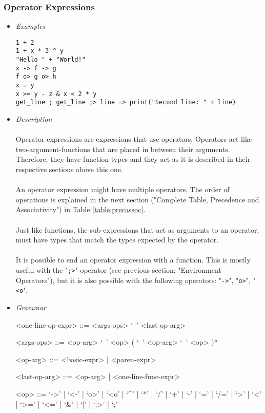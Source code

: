 \documentclass{article}
\begin{document}
\subsubsection{Operator Expressions}

\begin{itemize}
\item \textit{Examples}
\begin{verbatim}
1 + 2
1 + x * 3 ^ y
"Hello " + "World!"
x -> f -> g
f o> g o> h
x = y
x >= y - z & x < 2 * y
get_line ; get_line ;> line => print("Second line: " + line)
\end{verbatim}

\item \textit{Description}\\\\
Operator expressions are expressions that use operators. Operators act like
two-argument-functions that are placed in between their arguments. Therefore,
they have function types and they act as it is described in their respective
sections above this one.
\\\\
An operator expression might have multiple operators. The order of operations
is explained in the next section ("Complete Table, Precedence and Associativity")
in Table \ref{table:precassoc}.
\\\\
Just like functions, the sub-expressions
that act as arguments to an operator, must have types that match the types 
expected by the operator.
\\\\
It is possible to end an operator expression with a function. This is mostly
useful with the "\texttt{;>}" operator (see previous section: "Environment
Operators"), but it is also possible with the following operators:
"\texttt{->}", "\texttt{o>}", "\texttt{<o}".

\item \textit{Grammar}
\begin{grammar}
<one-line-op-expr> ::= <args-ops> `\ ' <last-op-arg>

<args-ops> ::= <op-arg> `\ ' <op>  ( `\ ' <op-arg>  `\ ' <op> )*

<op-arg> ::= <basic-expr> | <paren-expr>

<last-op-arg> ::= <op-arg> | <one-line-func-expr>

<op> ::= 
`->' | `<-' | `o>' | `<o' | `^' | `*' | `/' | `+' | `-' |
`=' | `/=' | `>' | `<' | `>=' | `<=' | `\&' | `|' | `;>' | `;'\\


\end{grammar}
\end{itemize}
\end{document}
